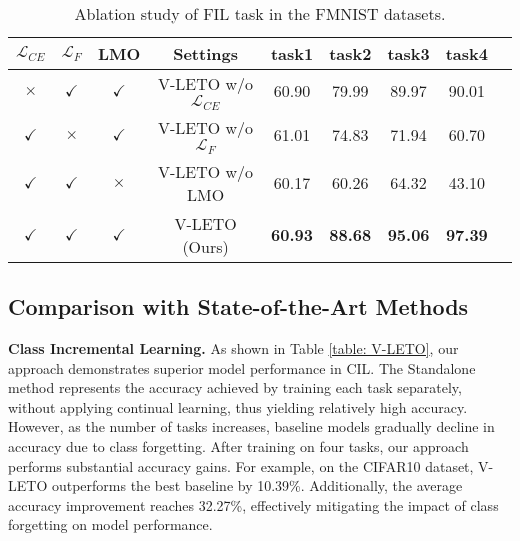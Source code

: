 \begin{table}[!t]
\centering
\setlength{\tabcolsep}{1.3pt}
\begin{tabular}{ccc|c|ccccc}
\toprule
 $\mathcal{L}_{CE}$ & $\mathcal{L}_{F}$ & LMO & \textbf{Settings} & task1 & task2 & task3 & task4 \\
\midrule
$\times$ & $\checkmark$ & $\checkmark$ & V-LETO w/o $\mathcal{L}_{CE}$ & 60.90 & 79.99 & 89.97 & 90.01 \\
$\checkmark$ & $\times$ & $\checkmark$ & V-LETO w/o $\mathcal{L}_{F}$ & 61.01 & 74.83 & 71.94 & 60.70 \\
$\checkmark$ & $\checkmark$ & $\times$ &V-LETO w/o LMO &  60.17 & 60.26 & 64.32 & 43.10 \\
$\checkmark$ & $\checkmark$ & $\checkmark$ & V-LETO (Ours)     &  \textbf{60.93} & \textbf{88.68}& \textbf{95.06} & \textbf{97.39} \\
\bottomrule
\end{tabular}
\caption{Ablation study of FIL task in the FMNIST datasets.}
\label{table: ablation-feature}
\end{table}











\subsection{Comparison with State-of-the-Art Methods}
\noindent\textbf{Class Incremental Learning.}
As shown in Table \ref{table: V-LETO}, our approach demonstrates superior model performance in CIL.
The Standalone method represents the accuracy achieved by training each task separately, without applying continual learning, thus yielding relatively high accuracy. 
However, as the number of tasks increases, baseline models gradually decline in accuracy due to class forgetting. 
After training on four tasks, our approach performs substantial accuracy gains. 
For example, on the CIFAR10 dataset, V-LETO outperforms the best baseline by 10.39\%. 
Additionally, the average accuracy improvement reaches 32.27\%, effectively mitigating the impact of class forgetting on model performance.




